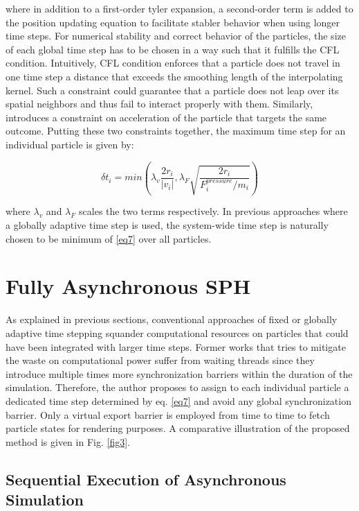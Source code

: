 \documentclass[
	11pt, 
	DIV10,
	ngerman,
	a4paper, 
	oneside, 
	headings=normal, 
	captions=tableheading,
	final, 
	numbers=noenddot
]{scrartcl}
\begin{document}
where in addition to a first-order tyler expansion, a second-order term is added to the position updating equation to facilitate stabler behavior when using longer time steps. For numerical stability and correct behavior of the particles, the size of each global time step has to be chosen in a way such that it fulfills the CFL condition. Intuitively, CFL condition enforces that a particle does not travel in one time step a distance that exceeds the smoothing length of the interpolating kernel. Such a constraint could guarantee that a particle does not leap over its spatial neighbors and thus fail to interact properly with them. Similarly, \cite{bender2010boundary} introduces a constraint on acceleration of the particle that targets the same outcome. Putting these two constraints together, the maximum time step for an individual particle is given by:

\begin{equation}
	\label{eq7}
	\delta t_{i} = min(\lambda_{v}\frac{2r_{i}}{|v_{i}|}, \lambda_{F}\sqrt{\frac{2r_{i}}{F_{i}^{pressure}/m_{i}}})
\end{equation}

where $ \lambda_{v} $ and $ \lambda_{F} $ scales the two terms respectively. In previous approaches where a globally adaptive time step is used, the system-wide time step is naturally chosen to be minimum of \ref{eq7} over all particles.


\section{Fully Asynchronous SPH}

As explained in previous sections, conventional approaches of fixed or globally adaptive time stepping squander computational resources on particles that could have been integrated with larger time steps. Former works that tries to mitigate the waste on computational power suffer from waiting threads since they introduce multiple times more synchronization barriers within the duration of the simulation. Therefore, the author proposes to assign to each individual particle a dedicated time step determined by eq. \ref{eq7} and avoid any global synchronization barrier. Only a virtual export barrier is employed from time to time to fetch particle states for rendering purposes. A comparative illustration of the proposed method is given in Fig. \ref{fig3}.

\subsection{Sequential Execution of Asynchronous Simulation}
\end{document}
